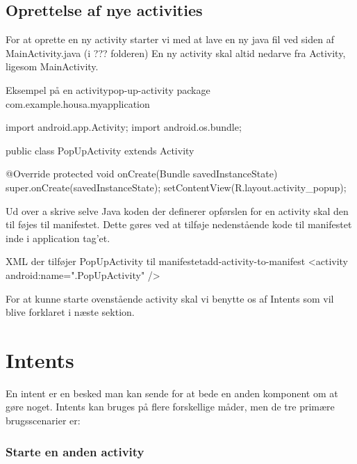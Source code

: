 \subsection{Oprettelse af nye activities}

For at oprette en ny activity starter vi med at lave en ny java fil ved siden af MainActivity.java (i ??? folderen) En ny activity skal altid nedarve fra Activity, ligesom MainActivity. 

\begin{example}\noindent
	\begin{JavaCode}{Eksempel på en activity}{pop-up-activity}
		package com.example.housa.myapplication
		
		import android.app.Activity;
		import android.os.bundle;
		
		public class PopUpActivity extends Activity {
		  
		  @Override
		  protected void onCreate(Bundle savedInstanceState) {
		    super.onCreate(savedInstanceState);
		    setContentView(R.layout.activity_popup);
		  }
		}
	\end{JavaCode}
\end{example}

Ud over a skrive selve Java koden der definerer opførslen for en activity skal den til føjes til manifestet. Dette gøres ved at tilføje nedenstående kode til manifestet inde i application tag'et.

\begin{example}\noindent
	\begin{XmlCode}{XML der tilføjer PopUpActivity til manifestet}{add-activity-to-manifest}
		<activity android:name=".PopUpActivity" />
	\end{XmlCode}
\end{example}

For at kunne starte ovenstående activity skal vi benytte os af Intents som vil blive forklaret i næste sektion.


\section{Intents}

En intent er en besked man kan sende for at bede en anden komponent om at gøre noget. Intents kan bruges på flere forskellige måder, men de tre primære brugsscenarier er:

\subsubsection{Starte en anden activity}

